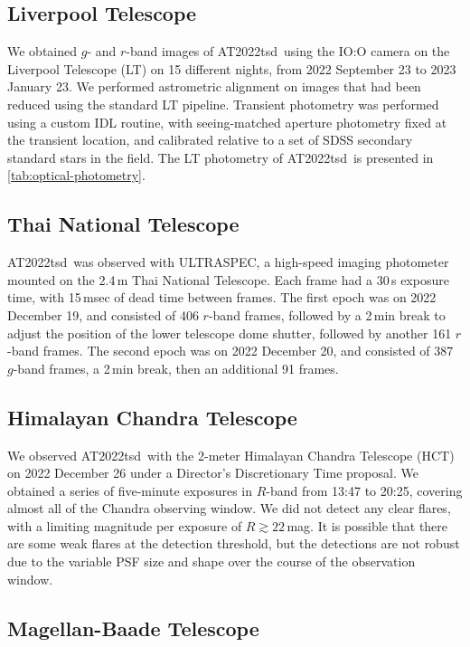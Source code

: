 \documentclass{nature_plusfigure}
\newcommand{\at}{AT2022tsd}
\begin{document}
\begin{methods}
\subsection{Liverpool Telescope}
\label{Methods: LT}

We obtained $g$- and $r$-band images of \at\ using the IO:O camera on the Liverpool Telescope\cite{Steele2004} (LT) on 15 different nights, from 2022 September 23 to 2023 January 23. We performed astrometric alignment on images that had been reduced using the standard LT pipeline. Transient photometry was performed using a custom IDL routine, with seeing-matched aperture photometry fixed at the transient location, and calibrated relative to a set of SDSS secondary standard stars in the field. The LT photometry of \at\ is presented in \ref{tab:optical-photometry}.

\subsection{Thai National Telescope}

\at\ was observed with ULTRASPEC\cite{Dhillon2014}, a high-speed imaging photometer mounted on the 2.4\,m Thai National Telescope. Each frame had a 30\,s exposure time, with 15\,msec of dead time between frames. The first epoch was on 2022 December 19, and consisted of 406 $r$-band frames, followed by a 2\,min break to adjust the position of the lower telescope dome shutter, followed by another 161 $r$-band frames. The second epoch was on 2022 December 20, and consisted of 387 $g$-band frames, a 2\,min break, then an additional 91 frames.

\subsection{Himalayan Chandra Telescope}
\label{sec:HCT}

We observed \at\ with the 2-meter Himalayan Chandra Telescope (HCT) on 2022 December 26 under a Director's Discretionary Time proposal. We obtained a series of five-minute exposures in $R$-band from 13:47 to 20:25, covering almost all of the Chandra observing window. We did not detect any clear flares, with a limiting magnitude per exposure of $R\gtrsim22\,$mag. It is possible that there are some weak flares at the detection threshold, but the detections are not robust due to the variable PSF size and shape over the course of the observation window.

\subsection{Magellan-Baade Telescope}
\label{sec:magellan}


\end{methods}
\end{document}
